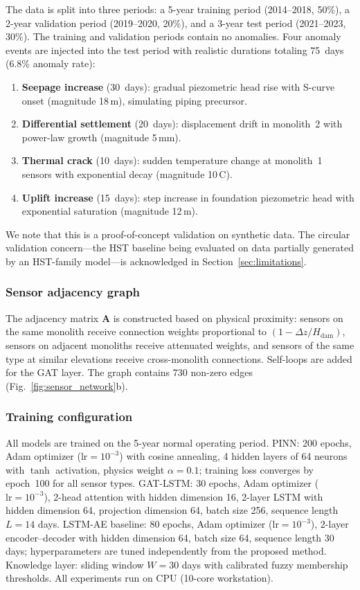 \documentclass[preprint,12pt,review]{elsarticle}
\begin{document}
The data is split into three periods: a 5-year training period (2014--2018, 50\%), a 2-year validation period (2019--2020, 20\%), and a 3-year test period (2021--2023, 30\%). The training and validation periods contain no anomalies. Four anomaly events are injected into the test period with realistic durations totaling 75~days (6.8\% anomaly rate):
\begin{enumerate}
\item \textbf{Seepage increase} (30~days): gradual piezometric head rise with S-curve onset (magnitude 18\,m), simulating piping precursor.
\item \textbf{Differential settlement} (20~days): displacement drift in monolith~2 with power-law growth (magnitude 5\,mm).
\item \textbf{Thermal crack} (10~days): sudden temperature change at monolith~1 sensors with exponential decay (magnitude 10\,\textdegree{}C).
\item \textbf{Uplift increase} (15~days): step increase in foundation piezometric head with exponential saturation (magnitude 12\,m).
\end{enumerate}

We note that this is a proof-of-concept validation on synthetic data. The circular validation concern---the HST baseline being evaluated on data partially generated by an HST-family model---is acknowledged in Section~\ref{sec:limitations}.

\subsubsection{Sensor adjacency graph}

The adjacency matrix $\mathbf{A}$ is constructed based on physical proximity: sensors on the same monolith receive connection weights proportional to $(1 - \Delta z / H_{\mathrm{dam}})$, sensors on adjacent monoliths receive attenuated weights, and sensors of the same type at similar elevations receive cross-monolith connections. Self-loops are added for the GAT layer. The graph contains 730 non-zero edges (Fig.~\ref{fig:sensor_network}b).

\subsubsection{Training configuration}

All models are trained on the 5-year normal operating period. PINN: 200 epochs, Adam optimizer ($\mathrm{lr} = 10^{-3}$) with cosine annealing, 4 hidden layers of 64 neurons with $\tanh$ activation, physics weight $\alpha = 0.1$; training loss converges by epoch~100 for all sensor types. GAT-LSTM: 30 epochs, Adam optimizer ($\mathrm{lr} = 10^{-3}$), 2-head attention with hidden dimension 16, 2-layer LSTM with hidden dimension 64, projection dimension 64, batch size 256, sequence length $L = 14$ days. LSTM-AE baseline: 80 epochs, Adam optimizer ($\mathrm{lr} = 10^{-3}$), 2-layer encoder--decoder with hidden dimension 64, batch size 64, sequence length 30 days; hyperparameters are tuned independently from the proposed method. Knowledge layer: sliding window $W = 30$ days with calibrated fuzzy membership thresholds. All experiments run on CPU (10-core workstation).
\end{document}
